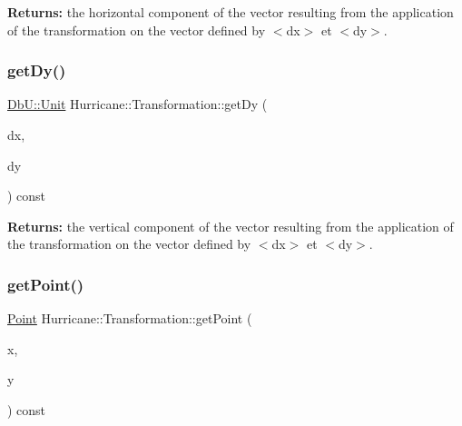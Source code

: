 {\bfseries Returns\+:} the horizontal component of the vector resulting from the application of the transformation on the vector defined by {\ttfamily $<$dx$>$} et {\ttfamily $<$dy$>$}. \mbox{\label{classHurricane_1_1Transformation_aa03354ff0a204e77863f392da8bb8678}} 
\subsubsection{\texorpdfstring{get\+Dy()}{getDy()}}
{\footnotesize\ttfamily \mbox{\hyperlink{group__DbUGroup_ga4fbfa3e8c89347af76c9628ea06c4146}{Db\+U\+::\+Unit}} Hurricane\+::\+Transformation\+::get\+Dy (\begin{DoxyParamCaption}\item[{const \mbox{\hyperlink{group__DbUGroup_ga4fbfa3e8c89347af76c9628ea06c4146}{Db\+U\+::\+Unit}} \&}]{dx,  }\item[{const \mbox{\hyperlink{group__DbUGroup_ga4fbfa3e8c89347af76c9628ea06c4146}{Db\+U\+::\+Unit}} \&}]{dy }\end{DoxyParamCaption}) const}

{\bfseries Returns\+:} the vertical component of the vector resulting from the application of the transformation on the vector defined by {\ttfamily $<$dx$>$} et {\ttfamily $<$dy$>$}. \mbox{\label{classHurricane_1_1Transformation_aea9a0f1d1ffeb4a38accbf0c9287a93f}} 
\subsubsection{\texorpdfstring{get\+Point()}{getPoint()}\hspace{0.1cm}{\footnotesize\ttfamily [1/2]}}
{\footnotesize\ttfamily \mbox{\hyperlink{classHurricane_1_1Point}{Point}} Hurricane\+::\+Transformation\+::get\+Point (\begin{DoxyParamCaption}\item[{const \mbox{\hyperlink{group__DbUGroup_ga4fbfa3e8c89347af76c9628ea06c4146}{Db\+U\+::\+Unit}} \&}]{x,  }\item[{const \mbox{\hyperlink{group__DbUGroup_ga4fbfa3e8c89347af76c9628ea06c4146}{Db\+U\+::\+Unit}} \&}]{y }\end{DoxyParamCaption}) const}

